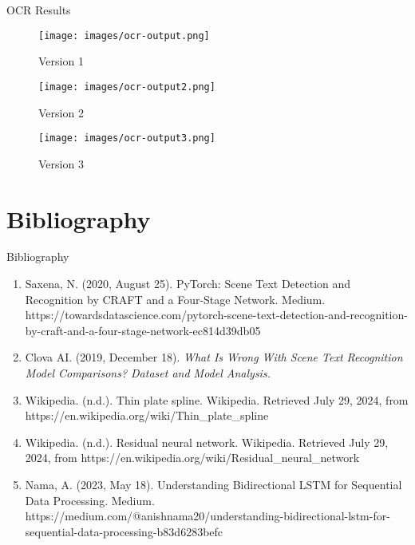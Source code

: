 \documentclass[aspectratio=169]{beamer}
\begin{document}
\begin{frame}{OCR Results} \pause
    \begin{figure}
        \begin{minipage}{.33\textwidth}
            \begin{center}
                \texttt{[image: images/ocr-output.png]}
                \caption{Version 1} \pause
            \end{center}
        \end{minipage}%
        \begin{minipage}{.33\textwidth}
            \begin{center}
                \texttt{[image: images/ocr-output2.png]}
                \caption{Version 2} \pause
            \end{center}
        \end{minipage}%
        \begin{minipage}{.33\textwidth}
            \begin{center}
                \texttt{[image: images/ocr-output3.png]}
                \caption{Version 3} \pause
            \end{center}
        \end{minipage}
    \end{figure}
\end{frame}

\section{Bibliography}

\begin{frame}{Bibliography}
    \begin{enumerate}
        \item Saxena, N. (2020, August 25). PyTorch: Scene Text Detection and Recognition by CRAFT and a Four-Stage Network. Medium. https://towardsdatascience.com/pytorch-scene-text-detection-and-recognition-by-craft-and-a-four-stage-network-ec814d39db05
        \item Clova AI. (2019, December 18). \textit{What Is Wrong With Scene Text Recognition Model Comparisons? Dataset and Model Analysis.}
        \item Wikipedia. (n.d.). Thin plate spline. Wikipedia. Retrieved July 29, 2024, from https://en.wikipedia.org/wiki/Thin\_plate\_spline
        \item Wikipedia. (n.d.). Residual neural network. Wikipedia. Retrieved July 29, 2024, from https://en.wikipedia.org/wiki/Residual\_neural\_network
        \item Nama, A. (2023, May 18). Understanding Bidirectional LSTM for Sequential Data Processing. Medium. https://medium.com/@anishnama20/understanding-bidirectional-lstm-for-sequential-data-processing-b83d6283befc
    \end{enumerate}
\end{frame}
\end{document}

